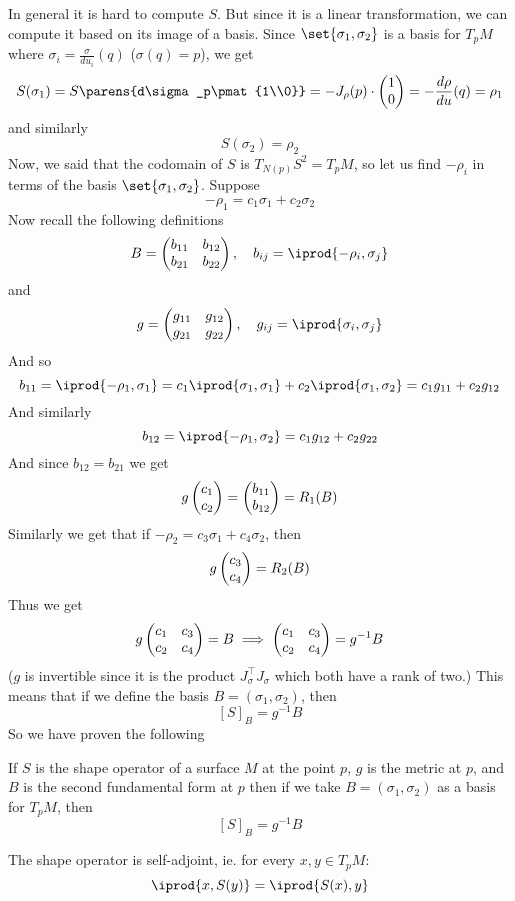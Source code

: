 In general it is hard to compute $S$.
But since it is a linear transformation, we can compute it based on its image of a basis.
Since $\set{\sigma_1,\sigma_2}$ is a basis for $T_pM$ where $\sigma_i=\frac\sigma{du_i}(q)$ ($\sigma(q)=p$), we get
\[ S(\sigma_1) = S\parens{d\sigma_p\pmat{1\\0}} = -J_\rho(p)\cdot\pmat{1\\0} = -\frac{d\rho}{du}(q) = \rho_1 \]
and similarly
\[ S(\sigma_2) = \rho_2 \]
Now, we said that the codomain of $S$ is $T_{N(p)}S^2=T_pM$, so let us find $-\rho_i$ in terms of the basis $\set{\sigma_1,\sigma_2}$.
Suppose
\[ -\rho_1 = c_1\sigma_1 + c_2\sigma_2 \]
Now recall the following definitions
\[ B = \pmat{b_{11} & b_{12} \\ b_{21} & b_{22}},\quad b_{ij} = \iprod{-\rho_i,\sigma_j} \]
and
\[ g = \pmat{g_{11} & g_{12} \\ g_{21} & g_{22}},\quad g_{ij} = \iprod{\sigma_i,\sigma_j} \]
And so
\[ b_{11} = \iprod{-\rho_1,\sigma_1} = c_1\iprod{\sigma_1,\sigma_1} + c_2\iprod{\sigma_1,\sigma_2} = c_1g_{11} + c_2g_{12} \]
And similarly
\[ b_{12} = \iprod{-\rho_1,\sigma_2} = c_1g_{12} + c_2g_{22} \]
And since $b_{12}=b_{21}$ we get
\[ g\begin{pmatrix}c_1\\c_2\end{pmatrix} = \begin{pmatrix}b_{11} \\ b_{12}\end{pmatrix} = R_1(B) \]
Similarly we get that if $-\rho_2 = c_3\sigma_1 + c_4\sigma_2$, then
\[ g\begin{pmatrix}c_3\\c_4\end{pmatrix} = R_2(B) \]
Thus we get
\[ g\begin{pmatrix}c_1 & c_3 \\ c_2 & c_4\end{pmatrix} = B \implies \begin{pmatrix}c_1 & c_3 \\ c_2 & c_4\end{pmatrix} = g^{-1}B \]
($g$ is invertible since it is the product $J_\sigma^\top J_\sigma$ which both have a rank of two.)
This means that if we define the basis $B=(\sigma_1,\sigma_2)$, then
\[ [S]_B = g^{-1}B \]
So we have proven the following

\begin{prop*}

    If $S$ is the shape operator of a surface $M$ at the point $p$, $g$ is the metric at $p$, and $B$ is the second fundamental form at $p$ then if we take $B=(\sigma_1,\sigma_2)$ as a basis for $T_pM$, then
    \[ [S]_B = g^{-1}B \]

\end{prop*}

\begin{prop*}

    The shape operator is self-adjoint, ie. for every $x,y\in T_pM$:
    \[ \iprod{x,S(y)} = \iprod{S(x),y} \]

\end{prop*}

